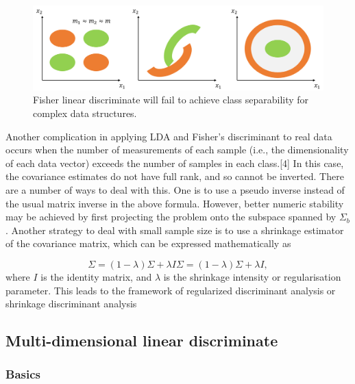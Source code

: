 \begin{refsection}
\begin{figure}[H]
	\centering
	\includegraphics[width=0.9\linewidth]{../figures/statisticalLearning/linearModelClassification/linearDiscriminateComplexStructureDemo}
	\caption{Fisher linear discriminate will fail to achieve class separability for complex data structures.}
	\label{fig:lineardiscriminatecomplexstructuredemo}
\end{figure}



\begin{remark}
	Another complication in applying LDA and Fisher's discriminant to real data occurs when the number of measurements of each sample (i.e., the dimensionality of each data vector) exceeds the number of samples in each class.[4] In this case, the covariance estimates do not have full rank, and so cannot be inverted. There are a number of ways to deal with this. One is to use a pseudo inverse instead of the usual matrix inverse in the above formula. However, better numeric stability may be achieved by first projecting the problem onto the subspace spanned by $\Sigma_{b}$. Another strategy to deal with small sample size is to use a shrinkage estimator of the covariance matrix, which can be expressed mathematically as
	
	$$\Sigma =(1-\lambda )\Sigma +\lambda I \Sigma =(1-\lambda )\Sigma +\lambda I,$$
	where $I$ is the identity matrix, and $ \lambda $ is the shrinkage intensity or regularisation parameter. This leads to the framework of regularized discriminant analysis or shrinkage discriminant analysis	
	
\end{remark}


\subsection{Multi-dimensional linear discriminate}

\subsubsection{Basics}


\end{refsection}
